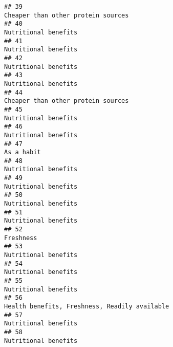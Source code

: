 \documentclass[
]{article}
\begin{document}
\begin{verbatim}
## 39                                                                                          Cheaper than other protein sources
## 40                                                                                                        Nutritional benefits
## 41                                                                                                        Nutritional benefits
## 42                                                                                                        Nutritional benefits
## 43                                                                                                        Nutritional benefits
## 44                                                                                          Cheaper than other protein sources
## 45                                                                                                        Nutritional benefits
## 46                                                                                                        Nutritional benefits
## 47                                                                                                                  As a habit
## 48                                                                                                        Nutritional benefits
## 49                                                                                                        Nutritional benefits
## 50                                                                                                        Nutritional benefits
## 51                                                                                                        Nutritional benefits
## 52                                                                                                                   Freshness
## 53                                                                                                        Nutritional benefits
## 54                                                                                                        Nutritional benefits
## 55                                                                                                        Nutritional benefits
## 56                                                                               Health benefits, Freshness, Readily available
## 57                                                                                                        Nutritional benefits
## 58                                                                                                        Nutritional benefits

\end{verbatim}
\end{document}

